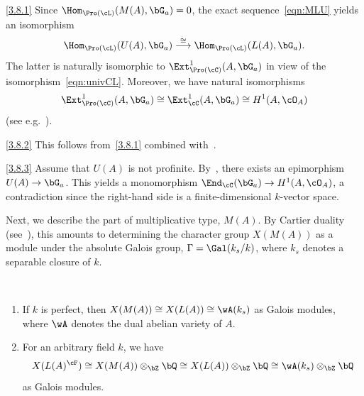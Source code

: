 \begin{proofc}
\begin{step}{\eqref{3.8.1}}%
Since $\Hom_{\Pro(\cL)}(M(A),\bG_a) = 0$, the exact sequence~\eqref{eqn:MLU} yields an isomorphism
\[
\Hom_{\Pro(\cL)}(U(A),\bG_a)
\stackrel{\cong}{\longrightarrow}
\Hom_{\Pro(\cL)}(L(A),\bG_a).
\]
The latter is naturally isomorphic to $\Ext^1_{\Pro(\cC)}(A,\bG_a)$ in view of the isomorphism~\eqref{eqn:univCL}. Moreover, we have natural isomorphisms
\[
\Ext^1_{\Pro(\cC)}(A,\bG_a) \cong
\Ext^1_{\cC}(A,\bG_a) \cong H^1(A,\cO_A)
\]
(see e.g.~\cite[III.17]{Oort}).
\end{step}

\begin{step}{\eqref{3.8.2}}%
This follows from~\eqref{3.8.1} combined with~\cite[IV.2.4.2]{DG}.
\end{step}

\begin{laststep}{\eqref{3.8.3}}%
Assume that $U(A)$ is not profinite. By~\cite[V.3.2.5]{DG}, there exists an epimorphism $U(A) \to \bG_a$. This yields a monomorphism $\End_{\cC}(\bG_a) \to H^1(A,\cO_A)$, a contradiction since the right-hand side is a finite-dimensional $k$-vector space.
\end{laststep}
\let\qed\relax
\end{proofc}

Next, we describe the part of multiplicative type, $M(A)$. By Cartier duality (see~\cite[IV.1.3.6]{DG}), this amounts to determining the character group $X(M(A))$ as a module under the absolute Galois group, $\Gamma = \Gal(k_s/k)$, where $k_s$ denotes a separable closure of $k$.

\begin{lemm}\label{lem:T(A)}\ 
\begin{enumerate}\romanenumi
\item \label{3.9.1} If $k$ is perfect, then $X(M(A)) \cong X(L(A)) \cong \wA(k_s)$ as Galois modules, where $\wA$ denotes the dual abelian variety of $A$.
\item \label{3.9.2} For an arbitrary field $k$, we have
\[
X(L(A)^{\cF}) \cong X(M(A)) \otimes_{\bZ} \bQ
\cong X(L(A)) \otimes_{\bZ} \bQ \cong
\wA(k_s) \otimes_{\bZ} \bQ
\]
as Galois modules.
\end{enumerate}
\end{lemm}

